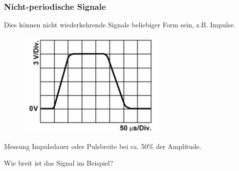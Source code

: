 \begin{frame}
  \frametitle{Nicht-periodische Signale}

  Dies können nicht wiederkehrende Signale beliebiger Form sein, z.B. Impulse.

  \begin{center}
    \begin{figure}
      \includegraphics[width=\textwidth,height=0.5\textheight,keepaspectratio]{a11/TB702a.png}
    \end{figure}
  \end{center}

  Messung Impulsdauer oder Pulsbreite bei ca. 50\% der Amplitude.

  Wie breit ist das Signal im Beispiel? 

\end{frame}

